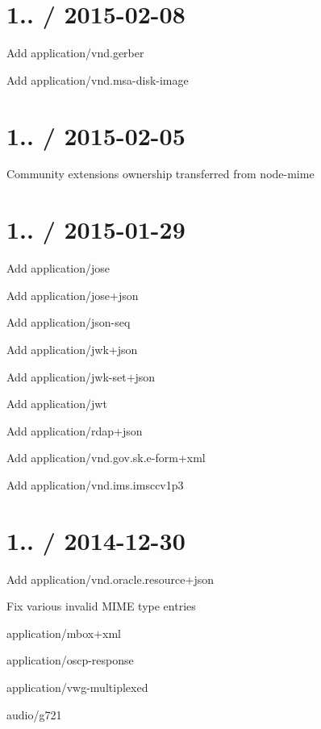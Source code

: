 \section*{1.. / 2015-\/02-\/08 }


\begin{DoxyItemize}
\item Add {\ttfamily application/vnd.\+gerber}
\item Add {\ttfamily application/vnd.\+msa-\/disk-\/image}
\end{DoxyItemize}

\section*{1.. / 2015-\/02-\/05 }


\begin{DoxyItemize}
\item Community extensions ownership transferred from {\ttfamily node-\/mime}
\end{DoxyItemize}

\section*{1.. / 2015-\/01-\/29 }


\begin{DoxyItemize}
\item Add {\ttfamily application/jose}
\item Add {\ttfamily application/jose+json}
\item Add {\ttfamily application/json-\/seq}
\item Add {\ttfamily application/jwk+json}
\item Add {\ttfamily application/jwk-\/set+json}
\item Add {\ttfamily application/jwt}
\item Add {\ttfamily application/rdap+json}
\item Add {\ttfamily application/vnd.\+gov.\+sk.\+e-\/form+xml}
\item Add {\ttfamily application/vnd.\+ims.\+imsccv1p3}
\end{DoxyItemize}

\section*{1.. / 2014-\/12-\/30 }


\begin{DoxyItemize}
\item Add {\ttfamily application/vnd.\+oracle.\+resource+json}
\item Fix various invalid M\+I\+ME type entries
\begin{DoxyItemize}
\item {\ttfamily application/mbox+xml}
\item {\ttfamily application/oscp-\/response}
\item {\ttfamily application/vwg-\/multiplexed}
\item {\ttfamily audio/g721}
\end{DoxyItemize}
\end{DoxyItemize}

